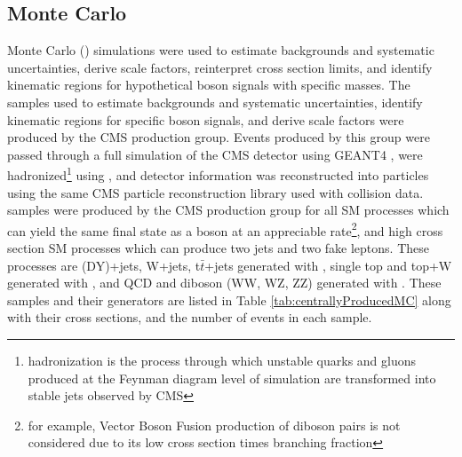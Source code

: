 \subsection{Monte Carlo}
\label{MC}
Monte Carlo (\MC) simulations were used to estimate backgrounds and systematic uncertainties, derive
scale factors, reinterpret \WR cross section limits, and identify kinematic regions for
hypothetical \WR boson signals with specific \WR masses.  The \MC samples used to estimate backgrounds
and systematic uncertainties, identify kinematic regions for specific \WR boson signals, and derive
scale factors were produced by the CMS \MC production group.  Events produced by this group were
passed through a full simulation of the CMS detector using GEANT4 \cite{geant4}, were hadronized\footnote{hadronization
is the process through which unstable quarks and gluons produced at the Feynman diagram level of simulation
are transformed into stable jets observed by CMS} using \PYTHIA, and detector information was reconstructed
into particles using the same CMS particle reconstruction library used with collision data.
\MC samples were produced by the CMS \MC production group for all SM processes which can yield
the same final state as a \WR boson at an appreciable rate\footnote{for example, Vector Boson Fusion production
of diboson pairs is not considered due to its low cross section times branching
fraction}, and high cross section SM processes which can produce two jets
and two fake leptons.  These processes are \DY (DY)+jets, W+jets, t$\bar{t}$+jets generated
with \MADGRAPH \cite{madgraph}, single top and top+W generated with \POWHEG \cite{powheg}, and
QCD and diboson (WW, WZ, ZZ) generated with \PYTHIA \cite{pythia8}\cite{Sjostrand:2006za}.
These samples and their generators are listed in Table \ref{tab:centrallyProducedMC} along
with their cross sections, and the number of events in each sample.

